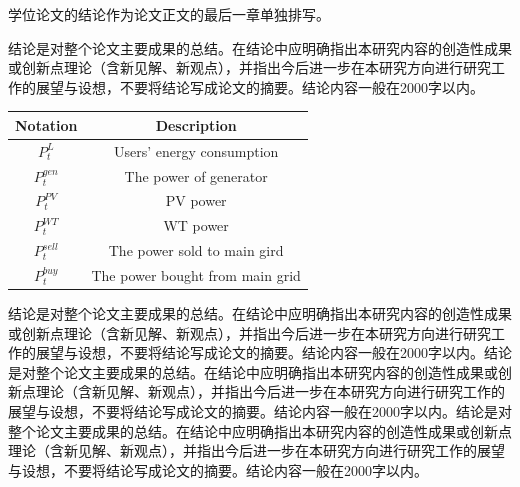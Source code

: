 \documentclass[a4paper, twoside, openany]{NCEPUMaster_Original}
\begin{document}
学位论文的结论作为论文正文的最后一章单独排写。

结论是对整个论文主要成果的总结。在结论中应明确指出本研究内容的创造性成果或创新点理论（含新见解、新观点），并指出今后进一步在本研究方向进行研究工作的展望与设想，不要将结论写成论文的摘要。结论内容一般在2000字以内。

\begin{table}[htbp]
\label{notation} %

\begin{tabularx}{\textwidth}{ C{0.4} C{0.6}}
    \toprule[1.5pt]
        Notation & Description   \\  
    \midrule[1pt]
        $P_{t}^L$ & Users' energy consumption \\ 
        $P_t^{gen}$ & The power of generator\\
        $P_t^{PV}$ & PV power \\ 
        $P_t^{WT}$ & WT power  \\
        $P_t^{sell}$ & The power sold to main gird \\ 
        $P_t^{buy}$ & The power bought from main grid\\
    \bottomrule[1.5pt]
\end{tabularx}
\end{table}

结论是对整个论文主要成果的总结。在结论中应明确指出本研究内容的创造性成果或创新点理论（含新见解、新观点），并指出今后进一步在本研究方向进行研究工作的展望与设想，不要将结论写成论文的摘要。结论内容一般在2000字以内。结论是对整个论文主要成果的总结。在结论中应明确指出本研究内容的创造性成果或创新点理论（含新见解、新观点），并指出今后进一步在本研究方向进行研究工作的展望与设想，不要将结论写成论文的摘要。结论内容一般在2000字以内。结论是对整个论文主要成果的总结。在结论中应明确指出本研究内容的创造性成果或创新点理论（含新见解、新观点），并指出今后进一步在本研究方向进行研究工作的展望与设想，不要将结论写成论文的摘要。结论内容一般在2000字以内。
\end{document}

